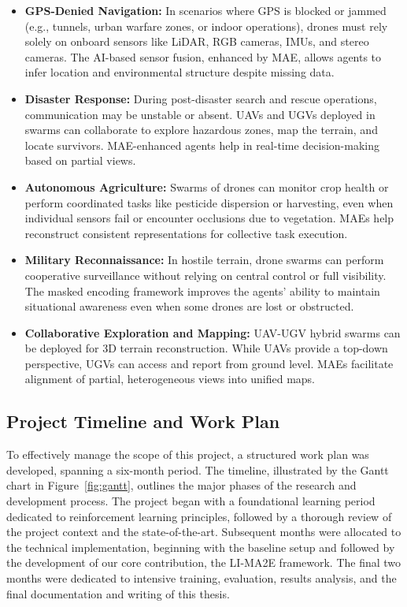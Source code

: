 \begin{itemize}
\item \textbf{GPS-Denied Navigation:} In scenarios where GPS is blocked or jammed (e.g., tunnels, urban warfare zones, or indoor operations), drones must rely solely on onboard sensors like LiDAR, RGB cameras, IMUs, and stereo cameras. The AI-based sensor fusion, enhanced by MAE, allows agents to infer location and environmental structure despite missing data.
\item \textbf{Disaster Response:} During post-disaster search and rescue operations, communication may be unstable or absent. UAVs and UGVs deployed in swarms can collaborate to explore hazardous zones, map the terrain, and locate survivors. MAE-enhanced agents help in real-time decision-making based on partial views.
\item \textbf{Autonomous Agriculture:} Swarms of drones can monitor crop health or perform coordinated tasks like pesticide dispersion or harvesting, even when individual sensors fail or encounter occlusions due to vegetation. MAEs help reconstruct consistent representations for collective task execution.
\item \textbf{Military Reconnaissance:} In hostile terrain, drone swarms can perform cooperative surveillance without relying on central control or full visibility. The masked encoding framework improves the agents' ability to maintain situational awareness even when some drones are lost or obstructed.
\item \textbf{Collaborative Exploration and Mapping:} UAV-UGV hybrid swarms can be deployed for 3D terrain reconstruction. While UAVs provide a top-down perspective, UGVs can access and report from ground level. MAEs facilitate alignment of partial, heterogeneous views into unified maps.
\end{itemize}

\subsection{Project Timeline and Work Plan}

To effectively manage the scope of this project, a structured work plan was developed, spanning a six-month period. The timeline, illustrated by the Gantt chart in Figure~\ref{fig:gantt}, outlines the major phases of the research and development process. The project began with a foundational learning period dedicated to reinforcement learning principles, followed by a thorough review of the project context and the state-of-the-art. Subsequent months were allocated to the technical implementation, beginning with the baseline setup and followed by the development of our core contribution, the LI-MA2E framework. The final two months were dedicated to intensive training, evaluation, results analysis, and the final documentation and writing of this thesis.

